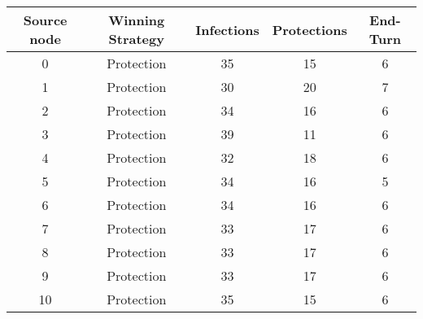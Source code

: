 \documentclass[results.tex]{subfiles}
\begin{document}
    \begin{center}
        \begin{tabular}{| c || c | c | c | c |}
            \hline
            {\bfseries Source node} & {\bfseries Winning Strategy} & {\bfseries Infections} & {\bfseries Protections}
            & {\bfseries End-Turn}
            \\  %
            \hline\hline
            0                       & Protection                   & 35                     & 15                      & 6                    \\
            \hline
            1                       & Protection                   & 30                     & 20                      & 7                    \\
            \hline
            2                       & Protection                   & 34                     & 16                      & 6                    \\
            \hline
            3                       & Protection                   & 39                     & 11                      & 6                    \\
            \hline
            4                       & Protection                   & 32                     & 18                      & 6                    \\
            \hline
            5                       & Protection                   & 34                     & 16                      & 5                    \\
            \hline
            6                       & Protection                   & 34                     & 16                      & 6                    \\
            \hline
            7                       & Protection                   & 33                     & 17                      & 6                    \\
            \hline
            8                       & Protection                   & 33                     & 17                      & 6                    \\
            \hline
            9                       & Protection                   & 33                     & 17                      & 6                    \\
            \hline
            10                      & Protection                   & 35                     & 15                      & 6                    \\

\end{tabular}
\end{center}
\end{document}
